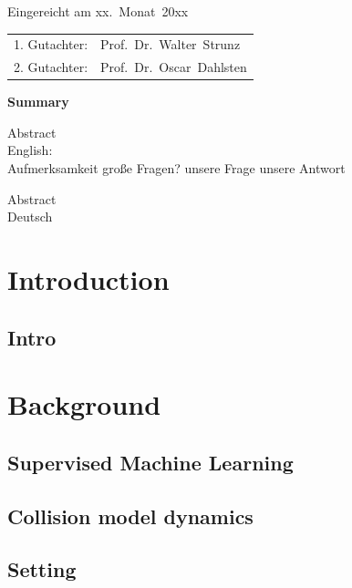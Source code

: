 \thispagestyle{empty}\vspace*{48em}

Eingereicht am xx.~Monat~20xx\vspace{1.5em}
\par{\large\begin{tabular}{ll}
 1. Gutachter: & Prof.~Dr.~Walter~Strunz \\
 2. Gutachter: & Prof.~Dr.~Oscar~Dahlsten \\
\end{tabular}}


\newpage
\begin{center}\large\bfseries Summary\end{center}


Abstract \\ 
English: \\
Aufmerksamkeit
große Fragen?
unsere Frage
unsere Antwort

\vspace{20em}
Abstract \\ 
Deutsch \\
 
 
\tableofcontents



\mainmatter

\chapter{Introduction}
\lipsum
\section{Intro}


\chapter{Background}
\section{Supervised Machine Learning} \label{sml}


\section{Collision model dynamics}

\section{Setting}



